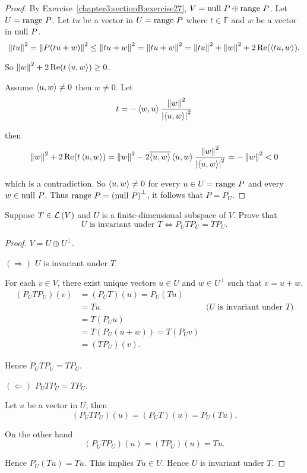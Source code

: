 \begin{proof}
    By Exercise~\ref{chapter3:sectionB:exercise27}, $V = \operatorname{null}\,{P}\oplus \operatorname{range}\,{P}$. Let $U = \operatorname{range}\,{P}$. Let $tu$ be a vector in $U = \operatorname{range}\,{P}$ where $t\in\mathbb{F}$ and $w$ be a vector in $\operatorname{null}\,{P}$.
    \[
        \left\Vert{tu}\right\Vert^{2} = \left\Vert{P(tu + w)}\right\Vert^{2} \leq \left\Vert{tu + w}\right\Vert^{2} = \left\Vert{tu + w}\right\Vert^{2} = \left\Vert{tu}\right\Vert^{2} + \left\Vert{w}\right\Vert^{2} + 2\operatorname{Re}(\left\langle{tu, w}\right\rangle).
    \]

    So $\left\Vert{w}\right\Vert^{2} + 2\operatorname{Re}(t\left\langle{u, w}\right\rangle)\geq 0$.

    Assume $\left\langle{u, w}\right\rangle\ne 0$ then $w\ne 0$. Let
    \[
        t = -\left\langle{w, u}\right\rangle\frac{\left\Vert{w}\right\Vert^{2}}{\left\vert{\left\langle{u, w}\right\rangle}\right\vert^{2}}
    \]

    then
    \[
        \left\Vert{w}\right\Vert^{2} + 2\operatorname{Re}(t\left\langle{u, w}\right\rangle) = \left\Vert{w}\right\Vert^{2} - 2\overline{\left\langle{u,w}\right\rangle}\left\langle{u,w}\right\rangle\frac{\left\Vert{w}\right\Vert^{2}}{\left\vert{\left\langle{u,w}\right\rangle}\right\vert^{2}} = -\left\Vert{w}\right\Vert^{2} < 0
    \]

    which is a contradiction. So $\left\langle{u, w}\right\rangle\ne 0$ for every $u\in U = \operatorname{range}\,{P}$ and every $w\in\operatorname{null}\,{P}$. Thus $\operatorname{range}\,{P} = {(\operatorname{null}\,{P})}^{\bot}$, it follows that $P = P_{U}$.
\end{proof}
\newpage

\begin{exercise}
    Suppose $T\in\mathcal{L}\left({V}\right)$ and $U$ is a finite-dimensional subspace of $V$. Prove that
    \[
        \text{$U$ is invariant under $T$} \Longleftrightarrow P_{U}TP_{U} = TP_{U}.
    \]
\end{exercise}

\begin{proof}
    $V = U\oplus U^{\bot}$.

    $(\Rightarrow)$ $U$ is invariant under $T$.

    For each $v\in V$, there exist unique vectors $u\in U$ and $w\in U^{\bot}$ such that $v = u + w$.
    \begin{align*}
        (P_{U}TP_{U})(v) & = (P_{U}T)(u) = P_{U}(Tu)                                           \\
                         & = Tu                          & \text{($U$ is invariant under $T$)} \\
                         & = T(P_{U}u)                                                         \\
                         & = T(P_{U}(u + w)) = T(P_{U}v)                                       \\
                         & = (TP_{U})(v).
    \end{align*}

    Hence $P_{U}TP_{U} = TP_{U}$.

    $(\Leftarrow)$ $P_{U}TP_{U} = TP_{U}$.

    Let $u$ be a vector in $U$, then
    \[
        (P_{U}TP_{U})(u) = (P_{U}T)(u) = P_{U}(Tu).
    \]

    On the other hand
    \[
        (P_{U}TP_{U})(u) = (TP_{U})(u) = Tu.
    \]

    Hence $P_{U}(Tu) = Tu$. This implies $Tu\in U$. Hence $U$ is invariant under $T$.
\end{proof}
\newpage

